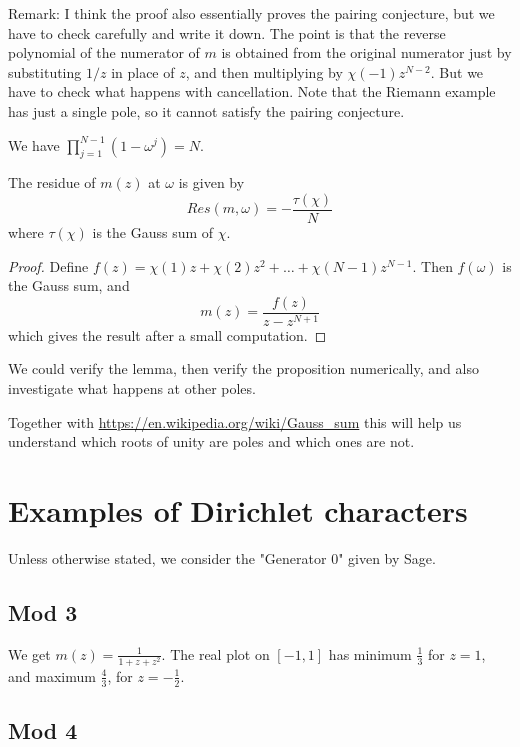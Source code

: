 \documentclass[a4paper]{amsart}
\begin{document}
Remark: I think the proof also essentially proves the pairing conjecture, but we have to check carefully and write it down. The point is that the reverse polynomial of the numerator of $m$ is obtained from the original numerator just by substituting $1/z$ in place of $z$, and then multiplying by $\chi(-1) z^{N-2}$. But we have to check what happens with cancellation. Note that the Riemann example has just a single pole, so it cannot satisfy the pairing conjecture.

\begin{lemma}
We have $\prod_{j=1}^{N-1} (1-\omega^j) = N$.
\end{lemma}

\begin{proposition}
The residue of $m(z)$ at $\omega$ is given by
$$ Res(m, \omega) = - \frac{\tau(\chi)}{N}   $$
where $\tau(\chi)$ is the Gauss sum of $\chi$.
\end{proposition}

\begin{proof}
Define $f(z) = \chi(1) z + \chi(2) z^2 + \ldots + \chi(N-1) z^{N-1}$. Then $f(\omega)$ is the Gauss sum, and
$$m(z) = \frac{f(z)}{z-z^{N+1}}$$
which gives the result after a small computation.
\end{proof}
We could verify the lemma, then verify the proposition numerically, and also investigate what happens at other poles.

Together with \url{https://en.wikipedia.org/wiki/Gauss_sum} this will help us understand which roots of unity are poles and which ones are not.

\section{Examples of Dirichlet characters}

Unless otherwise stated, we consider the "Generator 0" given by Sage.

\subsection{Mod 3}

We get $m(z) = \frac{1}{1+z+z^2}$. The real plot on $[-1, 1]$ has minimum $\frac{1}{3}$ for $z=1$, and maximum $\frac{4}{3}$, for $z=-\frac{1}{2}$.

\subsection{Mod 4}
\end{document}
